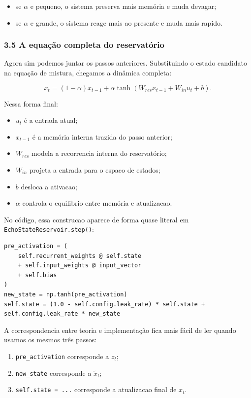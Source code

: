 \documentclass[12pt]{article}
\providecommand{\tightlist}{%
          \setlength{\itemsep}{0pt}\setlength{\parskip}{0pt}}
\begin{document}
\begin{itemize}
\tightlist
\item
  se \(\alpha\) e pequeno, o sistema preserva mais memória e muda devagar;
\item
  se \(\alpha\) e grande, o sistema reage mais ao presente e muda mais rapido.
\end{itemize}

\subsubsection{3.5 A equação completa do reservatório}\label{35-a-equauxe7uxe3o-completa-do-reservatuxf3rio}

Agora sim podemos juntar os passos anteriores. Substituindo o estado candidato na equação de mistura, chegamos a dinâmica completa:

\[
x_t = (1 - \alpha) x_{t-1} + \alpha \tanh(W_{res} x_{t-1} + W_{in} u_t + b).
\]

Nessa forma final:

\begin{itemize}
\tightlist
\item
  \(u_t\) é a entrada atual;
\item
  \(x_{t-1}\) é a memória interna trazida do passo anterior;
\item
  \(W_{res}\) modela a recorrencia interna do reservatório;
\item
  \(W_{in}\) projeta a entrada para o espaco de estados;
\item
  \(b\) desloca a ativacao;
\item
  \(\alpha\) controla o equilibrio entre memória e atualizacao.
\end{itemize}

No código, essa construcao aparece de forma quase literal em \texttt{EchoStateReservoir.step()}:

\begin{verbatim}
pre_activation = (
    self.recurrent_weights @ self.state
    + self.input_weights @ input_vector
    + self.bias
)
new_state = np.tanh(pre_activation)
self.state = (1.0 - self.config.leak_rate) * self.state + self.config.leak_rate * new_state
\end{verbatim}

A correspondencia entre teoria e implementação fica mais fácil de ler quando usamos os mesmos três passos:

\begin{enumerate}
\def\labelenumi{\arabic{enumi}.}
\tightlist
\item
  \texttt{pre\_activation} corresponde a \(z_t\);
\item
  \texttt{new\_state} corresponde a \(\widetilde{x}_t\);
\item
  \texttt{self.state\ =\ ...} corresponde a atualizacao final de \(x_t\).
\end{enumerate}
\end{document}
